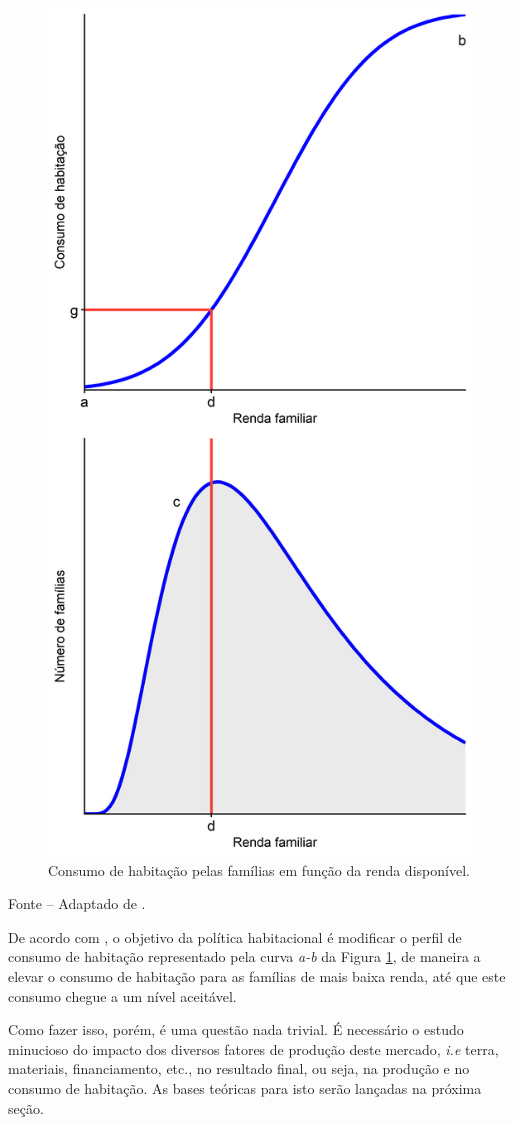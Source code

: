 \documentclass[
	12pt,				%
	oneside,			%
	a4paper,			%
	chapter=TITLE,		%
	section=TITLE,		%
	english,			%
	brazil				%
	]{abntex2}
\newcommand{\bcenter}{\begin{center}}
\newcommand{\ecenter}{\end{center}}
\begin{document}
\begin{refsection}
\begin{figure}[H]
{\centering \includegraphics[width=0.7\linewidth]{images/basicModel-1} 

}

\caption{Consumo de habitação pelas famílias em função da renda disponível.}\label{fig:basicModel}
\end{figure}
\bcenter

\small Fonte -- Adaptado de \textcite[p.~250]{bertaud}.
\ecenter

De acordo com \textcite[p.~250]{bertaud}, o objetivo da política habitacional é modificar
o perfil de consumo de habitação representado pela curva \emph{a-b} da Figura
\ref{fig:basicModel}, de maneira a elevar o consumo de habitação para as
famílias de mais baixa renda, até que este consumo chegue a um nível aceitável.

Como fazer isso, porém, é uma questão nada trivial. É necessário o estudo
minucioso do impacto dos diversos fatores de produção deste mercado, \emph{i.e}
terra, materiais, financiamento, etc., no resultado final, ou seja, na produção
e no consumo de habitação. As bases teóricas para isto serão lançadas na próxima
seção.


\end{refsection}
\end{document}
